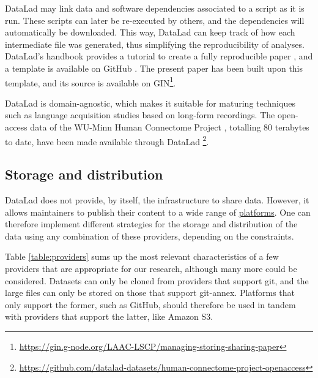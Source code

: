 \documentclass[smallextended]{svjour3}       %
\begin{document}
DataLad may link data and software dependencies associated to a script as it is run. These scripts can later be re-executed by others, and the dependencies will automatically be downloaded. This way, DataLad can keep track of how each intermediate file was generated, thus simplifying the reproducibility of analyses. DataLad's handbook provides a tutorial to create a fully reproducible paper \citep[Chapter~22]{datalad_handbook}, and a template is available on GitHub \citep{reproducible_paper}. The present paper has been built upon this template, and its source is available on GIN\footnote{\url{https://gin.g-node.org/LAAC-LSCP/managing-storing-sharing-paper}}.

DataLad is domain-agnostic, which makes it suitable for maturing techniques such as language acquisition studies based on long-form recordings. The open-access data of the WU-Minn Human Connectome Project \citep{pub.1022076283}, totalling 80 terabytes to date, have been made available through DataLad \footnote{\label{note:hcp}\url{https://github.com/datalad-datasets/human-connectome-project-openaccess}}.


\subsection{Storage and distribution}\label{section:gin}

DataLad does not provide, by itself, the infrastructure to share data. However, it allows maintainers to publish their content to a wide range of \href{https://git-annex.branchable.com/special_remotes/}{platforms}. One can therefore implement different strategies for the storage and distribution of the data using any combination of these providers, depending on the constraints.

Table \ref{table:providers} sums up the most relevant characteristics of a few providers that are appropriate for our research, although many more could be considered. Datasets can only be cloned from providers that support git, and the large files can only be stored on those that support git-annex. Platforms that only support the former, such as GitHub, should therefore be used in tandem with providers that support the latter, like Amazon S3.
\end{document}

